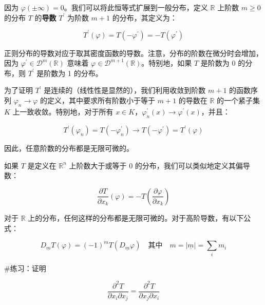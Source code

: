 因为
\(\varphi( \pm \infty) = 0\)。我们可以将此恒等式扩展到一般分布，定义
\(\mathbb{R}\) 上阶数 \(m \geq 0\) 的分布 \(T\) 的\textbf{导数}
\(T^{\prime}\) 为阶数 \(m + 1\) 的分布，其定义为：

\[T^{\prime}(\varphi) = T\left( - \varphi^{\prime} \right) = - T\left( \varphi^{\prime} \right)\]

正则分布的导数对应于取其密度函数的导数。注意，分布的阶数在微分时会增加，因为
\(\varphi^{\prime} \in \mathcal{D}^{m}\left( \mathbb{R} \right)\) 意味着
\(\varphi \in \mathcal{D}^{m + 1}\left( \mathbb{R} \right)\)。特别地，如果
\(T\) 是阶数为 0 的分布，则 \(T^{\prime}\) 是阶数为 1 的分布。

为了证明 \(T^{\prime}\) 是连续的（线性性是显然的），我们利用收敛到阶数
\(m + 1\) 的函数序列 \(\varphi_{n} \rightarrow \varphi\)
的定义，其中要求所有阶数小于等于 \(m + 1\) 的导数在 \(\mathbb{R}\)
的一个紧子集 \(K\) 上一致收敛。特别地，对于所有
\(x \in K\)，\(\varphi_{n}^{\prime}(x) \rightarrow \varphi^{\prime}(x)\)，并且：

\[T^{\prime}\left( \varphi_{n} \right) = T\left( - \varphi_{n}^{\prime} \right) \rightarrow T\left( - \varphi^{\prime} \right) = T^{\prime}(\varphi)\]

因此，任意阶数的分布都是无限可微的。

如果 \(T\) 是定义在 \(\mathbb{R}^{n}\) 上阶数大于或等于 0
的分布，我们可以类似地定义其偏导数：

\[\frac{\partial T}{\partial x_{k}}(\varphi) = - T\left( \frac{\partial\varphi}{\partial x_{k}} \right)\]

对于 \(\mathbb{R}\)
上的分布，任何这样的分布都是无限可微的。对于高阶导数，有以下公式：

\[D_{\underline{m}}T(\varphi) = ( - 1)^{m}T\left( D_{\underline{m}}\varphi \right)\quad\mathrm{\text{其中}}\quad m = \left| \underline{m} \right| = \sum_{i}m_{i}\]

\#练习：证明

\[\frac{\partial^{2}T}{\partial x_{i}\partial x_{j}} = \frac{\partial^{2}T}{\partial x_{j}\partial x_{i}}\]

